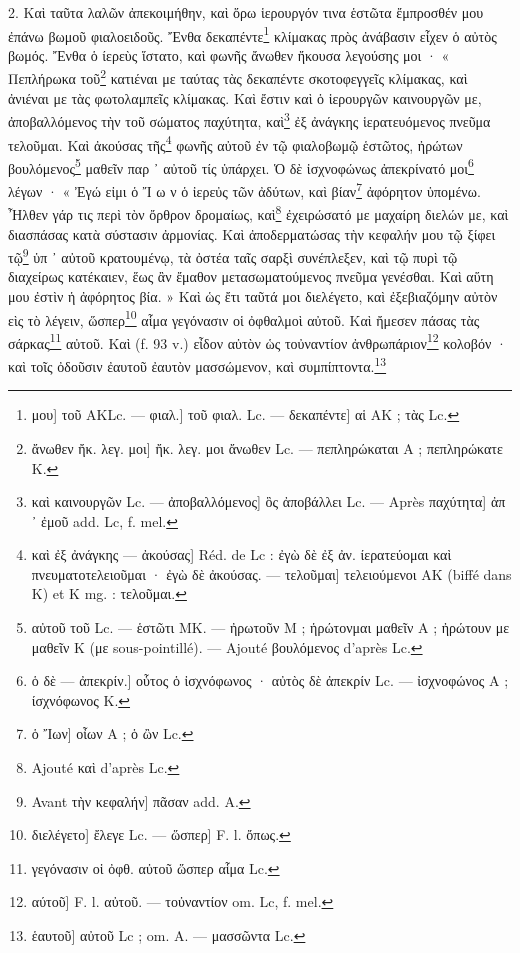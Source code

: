 \documentclass[a4paper, 11pt, oneside, polutonikogreek, french]{article}
\begin{document}
2. Καὶ ταῦτα λαλῶν ἀπεκοιμήθην, καὶ ὅρω ἱερουργόν τινα ἑστῶτα ἔμπροσθέν μου ἐπάνω βωμοῦ φιαλοειδοῦς. Ἔνθα δεκαπέντε\footnote{μου] τοῦ AKLc. --- φιαλ.] τοῦ φιαλ. Lc. --- δεκαπέντε] αἱ AK ; τὰς Lc.} κλίμακας πρὸς ἀνάβασιν εἶχεν ὁ αὐτὸς βωμός. Ἔνθα ὁ ίερεὺς ἵστατο, καὶ φωνῆς ἄνωθεν ἤκουσα λεγούσης μοι · « Πεπλήρωκα τοῦ\footnote{ἄνωθεν ἤκ. λεγ. μοι] ἤκ. λεγ. μοι ἄνωθεν Lc. --- πεπληρώκαται A ; πεπληρώκατε K.} κατιέναι με ταύτας τὰς δεκαπέντε σκοτοφεγγεῖς κλίμακας, καὶ ἀνιέναι με τὰς φωτολαμπεῖς κλίμακας. Καὶ ἔστιν καὶ ὁ ἱερουργῶν καινουργῶν με, ἀποβαλλόμενος τὴν τοῦ σώματος παχύτητα, καὶ\footnote{καὶ καινουργῶν Lc. --- ἀποβαλλόμενος] ὃς ἀποβάλλει Lc. --- Après παχύτητα] ἀπ ᾽ ἐμοῦ add. Lc, f. mel.} ἐξ ἀνάγκης ἱερατευόμενος πνεῦμα τελοῦμαι. Καὶ ἀκούσας τῆς\footnote{καὶ ἐξ ἀνάγκης --- ἀκούσας] Réd. de Lc : ἐγὼ δὲ ἐξ ἀν. ίερατεύομαι καὶ πνευματοτελειοῦμαι · ἐγὼ δὲ ἀκούσας. --- τελοῦμαι] τελειούμενοι AK (biffé dans K) et K mg. : τελοῦμαι.} φωνῆς αὐτοῦ ἐν τῷ φιαλοβωμῷ ἑστῶτος, ἠρώτων βουλόμενος\footnote{αὐτοῦ τοῦ Lc. --- ἑστῶτι MK. --- ἠρωτοῦν M ; ἡρώτονμαι μαθεῖν A ; ἠρώτουν με μαθεῖν K (με sous-pointillé). --- Ajouté βουλόμενος d'après Lc.} μαθεῖν παρ ᾽ αὐτοῦ τίς ὑπάρχει. Ὁ δὲ ἰσχνοφώνως ἀπεκρίνατό μοι\footnote{ὁ δὲ --- ἀπεκρίν.] οὗτος ὁ ἰσχνόφωνος · αὐτὸς δὲ ἀπεκρίν Lc. --- ἰσχνοφώνος A ; ίσχνόφωνος K.} λέγων · « Ἐγώ εἰμι ὁ Ἴ ω ν ὁ ἰερεὐς τῶν ἀδύτων, καὶ βίαν\footnote{ὁ Ἴων] οἶων A ; ὁ ὢν Lc.} ἀφόρητον ὑπομένω. Ἦλθεν γάρ τις περὶ τὸν ὄρθρον δρομαίως, καὶ\footnote{Ajouté καὶ d'après Lc.} ἐχειρώσατό με μαχαίρη διελών με, καὶ διασπάσας κατὰ σύστασιν ἀρμονίας. Καὶ ἀποδερματώσας τὴν κεφαλήν μου τῷ ξίφει τῷ\footnote{Avant τὴν κεφαλήν] πᾶσαν add. A.} ὑπ ᾽ αὐτοῦ κρατουμένῳ, τὰ ὀστέα ταῖς σαρξὶ συνέπλεξεν, καὶ τῷ πυρὶ τῷ διαχείρως κατέκαιεν, ἕως ἂν ἔμαθον μετασωματούμενος πνεῦμα γενέσθαι. Καὶ αὕτη μου ἐστὶν ἡ ἀφόρητος βία. » Καὶ ὡς ἔτι ταῦτά μοι διελέγετο, καὶ ἐξεβιαζόμην αὐτὸν εὶς τὸ λέγειν, ὥσπερ\footnote{διελέγετο] ἔλεγε Lc. --- ὥσπερ] F. l. ὄπως.} αἷμα γεγόνασιν οἱ ὀφθαλμοὶ αὐτοῦ. Καὶ ἤμεσεν πάσας τὰς σάρκας\footnote{γεγόνασιν οἱ ὀφθ. αὐτοῦ ὥσπερ αἷμα Lc.} αὐτοῦ. Καὶ (f. 93 v.) εἶδον αὐτὸν ὡς τοὐναντίον ἀνθρωπάριον\footnote{αύτοῦ] F. l. αὐτοῦ. --- τοὐναντίον om. Lc, f. mel.} κολοβόν · καὶ τοῖς ὀδοῦσιν ἐαυτοῦ ἐαυτὸν μασσώμενον, καὶ συμπίπτοντα.\footnote{ἑαυτοῦ] αὐτοῦ Lc ; om. A. --- μασσῶντα Lc.}
\end{document}
